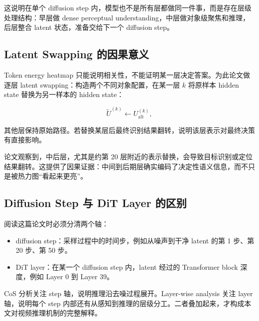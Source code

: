 这说明在单个 diffusion step 内，模型也不是所有层都做同一件事，而是存在层级处理结构：早层做 dense perceptual understanding，中层做对象级聚焦和推理，后层整合 latent 状态，准备交给下一个 diffusion step。

\subsection{Latent Swapping 的因果意义}

Token energy heatmap 只能说明相关性，不能证明某一层决定答案。为此论文做逐层 latent swapping：构造两个不同对象配置，在某一层 $k$ 将原样本 hidden state 替换为另一样本的 hidden state：

\begin{equation}
    \tilde{U}^{(k)} \leftarrow U_{\mathrm{alt}}^{(k)},
\end{equation}

其他层保持原始路径。若替换某层后最终识别结果翻转，说明该层表示对最终决策有直接影响。

论文观察到，中后层，尤其是约第 20 层附近的表示替换，会导致目标识别或定位结果翻转。这提供了因果证据：中间到后期层确实编码了决定性语义信息，而不只是被热力图“看起来更亮”。

\subsection{Diffusion Step 与 DiT Layer 的区别}

阅读这篇论文时必须分清两个轴：

\begin{itemize}
    \item diffusion step：采样过程中的时间步，例如从噪声到干净 latent 的第 1 步、第 20 步、第 50 步。
    \item DiT layer：在某一个 diffusion step 内，latent 经过的 Transformer block 深度，例如 Layer 0 到 Layer 39。
\end{itemize}

CoS 分析关注 step 轴，说明推理沿去噪过程展开。Layer-wise analysis 关注 layer 轴，说明每个 step 内部还有从感知到推理的层级分工。二者叠加起来，才构成本文对视频推理机制的完整解释。

